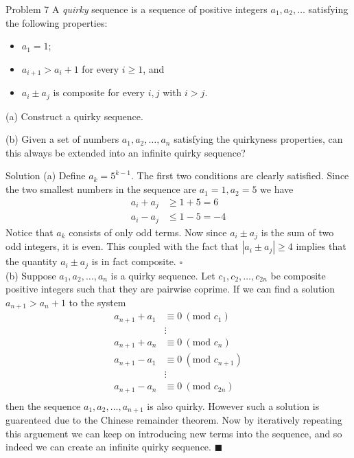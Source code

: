 \documentclass{article}
\begin{document}
\begin{problem}{Problem 7}
A \textit{quirky} sequence is a sequence of positive integers
$a_1, a_2, \ldots$ satisfying the following properties:
\begin{itemize}
\item $a_1 = 1$;
\item $a_{i+1} > a_i + 1$ for every $i\geq 1$, and
\item $a_i \pm a_j$ is composite for every $i,j$ with $i > j$.
\end{itemize}
(a) Construct a quirky sequence.
\vspace{0.2cm}

(b) Given a set of numbers $a_1, a_2, \ldots, a_n$ satisfying the quirkyness
properties, can this always be extended into an infinite quirky sequence?
\end{problem}

\begin{solution}{Solution}
(a) Define $a_k = 5^{k-1}$. The first two conditions are clearly satisfied.
Since the two smallest numbers in the sequence
are $a_1 = 1, a_2 = 5$ we have
\[
\begin{aligned}
a_i + a_j &\geq 1 + 5 = 6\\
a_i - a_j &\leq 1 - 5 = -4
\end{aligned}
\]
Notice that $a_k$ consists of only odd terms.
Now since $a_i \pm a_j$ is the sum of two odd integers, it is even. This
coupled with the fact that $|a_i \pm a_j| \geq 4$ implies that the quantity
$a_i \pm a_j$ is in fact composite. $\square$\\

(b) Suppose $a_1, a_2, \ldots, a_n$ is a quirky sequence. Let
$c_1, c_2, \ldots, c_{2n}$ be composite positive integers such
that they are pairwise coprime. If we can find a solution
$a_{n+1} > a_n + 1$ to the system
\[
\begin{aligned}
a_{n+1} + a_1 &\equiv 0 \ (\text{mod } c_1)\\
&\vdots\\
a_{n+1} + a_n &\equiv 0 \ (\text{mod } c_n)\\
a_{n+1} - a_1 &\equiv 0 \ (\text{mod } c_{n+1})\\
&\vdots\\
a_{n+1} - a_n &\equiv 0 \ (\text{mod } c_{2n})\\
\end{aligned}
\]
then the sequence $a_1, a_2, \ldots, a_{n+1}$ is also quirky. However such
a solution is guarenteed due to the Chinese remainder theorem. Now by
iteratively repeating this arguement we can keep on introducing new terms
into the sequence, and so indeed we can create an infinite quirky sequence.
$\blacksquare$
\end{solution}
\newpage
\end{document}
